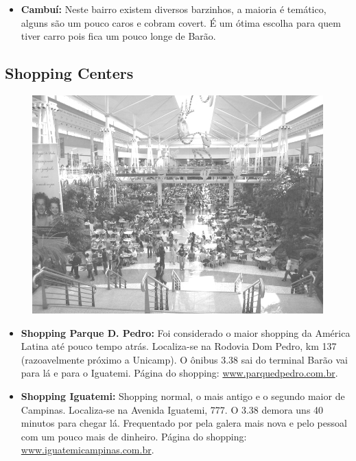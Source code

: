\begin{itemize}
\item  \textbf{Cambuí:} Neste bairro existem diversos barzinhos, a maioria é temático, alguns são um pouco caros e cobram covert. É um ótima escolha para quem tiver carro pois fica um pouco longe de Barão.
\end{itemize}

\subsection{Shopping Centers}
\begin{figure}[h!]
    \centering
    \includegraphics[scale=0.28,keepaspectratio=true]{img/imgs/7-diversao/-057.jpg}
\end{figure}


\begin{itemize}
\item  \textbf{Shopping Parque D. Pedro:} Foi considerado o maior shopping da América Latina até pouco tempo atrás. Localiza-se na Rodovia Dom Pedro, km 137 (razoavelmente próximo a Unicamp). O ônibus 3.38 sai do terminal Barão vai para lá e para o Iguatemi. Página do shopping: \url{www.parquedpedro.com.br}.
\end{itemize}

\begin{itemize}
\item  \textbf{Shopping Iguatemi:} Shopping normal, o mais antigo e o segundo maior de Campinas. Localiza-se na Avenida Iguatemi, 777. O 3.38 demora uns 40 minutos para chegar lá. Frequentado por pela galera mais nova e pelo pessoal com um pouco mais de dinheiro. Página do shopping: \url{www.iguatemicampinas.com.br}.
\end{itemize}

